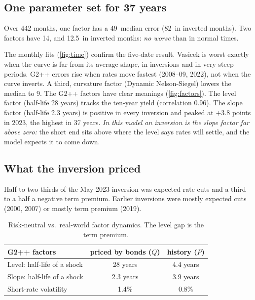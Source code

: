 \subsection{One parameter set for 37 years}

\begin{takeaway}
Over 442 months, one factor has a 49\bp\ median error (82\bp\ in inverted months). Two factors have 14\bp, and 12.5\bp\ in inverted months: \emph{no worse} than in normal times.
\end{takeaway}

The monthly fits (\cref{fig:time}) confirm the five-date result. Vasicek is worst exactly when the curve is far from its average shape, in inversions and in very steep periods. G2++ errors rise when rates move fastest (2008--09, 2022), not when the curve inverts. A third, curvature factor (Dynamic Nelson-Siegel) lowers the median to 9\bp. The G2++ factors have clear meanings (\cref{fig:factors}). The level factor (half-life 28 years) tracks the ten-year yield (correlation 0.96). The slope factor (half-life 2.3 years) is positive in every inversion and peaked at $+3.8$ points in 2023, the highest in 37 years. \emph{In this model an inversion is the slope factor far above zero:} the short end sits above where the level says rates will settle, and the model expects it to come down.

\subsection{What the inversion priced}

\begin{takeaway}
Half to two-thirds of the May 2023 inversion was expected rate cuts and a third to a half a negative term premium. Earlier inversions were mostly expected cuts (2000, 2007) or mostly term premium (2019).
\end{takeaway}


\begin{table}[h]
\centering\small
\begin{tabular}{@{}lcc@{}}
\toprule
G2++ factors & priced by bonds ($Q$) & history ($P$) \\
\midrule
Level: half-life of a shock & 28 years & 4.4 years \\
Slope: half-life of a shock & 2.3 years & 3.9 years \\
Short-rate volatility & 1.4\% & 0.8\% \\
\bottomrule
\end{tabular}
\caption{Risk-neutral vs.\ real-world factor dynamics. The level gap is the term premium.}
\label{tab:pq}
\end{table}

